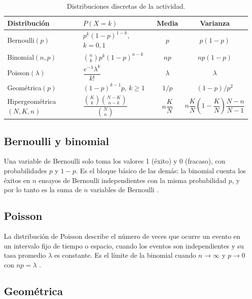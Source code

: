 \documentclass[11pt,letterpaper]{article}
\begin{document}
\begin{table}[htbp]
\centering
\caption{Distribuciones discretas de la actividad.}
\label{tab:resumen}
\small
\renewcommand{\arraystretch}{1.6}
\begin{tabular}{llcc}
\hline
\textbf{Distribución} & \textbf{$P(X = k)$} & \textbf{Media} & \textbf{Varianza} \\
\hline
Bernoulli$(p)$ & $p^k(1-p)^{1-k}$, \; $k = 0, 1$ & $p$ & $p(1-p)$ \\
Binomial$(n, p)$ & $\binom{n}{k}p^k(1-p)^{n-k}$ & $np$ & $np(1-p)$ \\
Poisson$(\lambda)$ & $\dfrac{e^{-\lambda}\lambda^k}{k!}$ & $\lambda$ & $\lambda$ \\
Geométrica$(p)$ & $(1-p)^{k-1}p$, \; $k \ge 1$ & $1/p$ & $(1-p)/p^2$ \\
Hipergeométrica$(N, K, n)$ & $\dfrac{\binom{K}{k}\binom{N-K}{n-k}}{\binom{N}{n}}$ & $n\dfrac{K}{N}$ & $n\dfrac{K}{N}\left(1-\dfrac{K}{N}\right)\dfrac{N-n}{N-1}$ \\
\hline
\end{tabular}
\end{table}

\subsection{Bernoulli y binomial}

Una variable de Bernoulli solo toma los valores 1 (éxito) y 0 (fracaso), con probabilidades $p$ y $1 - p$. Es el bloque básico de las demás: la binomial cuenta los éxitos en $n$ ensayos de Bernoulli independientes con la misma probabilidad $p$, y por lo tanto es la suma de $n$ variables de Bernoulli \parencite{tecnm2026_documento_fuente}.

\subsection{Poisson}

La distribución de Poisson describe el número de veces que ocurre un evento en un intervalo fijo de tiempo o espacio, cuando los eventos son independientes y su tasa promedio $\lambda$ es constante. Es el límite de la binomial cuando $n \to \infty$ y $p \to 0$ con $np = \lambda$ \parencite{tecnm2026_documento_fuente}.

\subsection{Geométrica}
\end{document}
